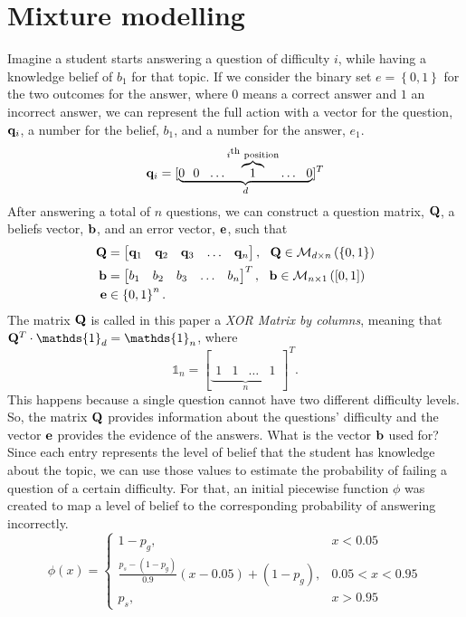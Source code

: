 \documentclass{article}
\newcommand{\0}{\mathbbold{0}}
\newcommand{\1}{\mathds{1}}
\begin{document}
\section{Mixture modelling}
Imagine a student starts answering a question of difficulty $i$, while having a knowledge belief of $b_1$ for that topic.
If we consider the binary set $e = \left\{0,1\right\}$ for the two outcomes for the answer, where $0$ means a correct answer and $1$ an incorrect answer,
we can represent the full action with a vector for the question, ${\bf q}_i$, a number for the belief, $b_1$, and a number for the answer, $e_1$.
\[ {\bf q}_i = [\underbrace{0 ~~ 0 ~~ \hdots \overbrace{1}^{i\textsuperscript{th}\text{ position}} \hdots ~~ 0}_d]^T \]
After answering a total of $n$ questions, we can construct a question matrix, ${\bf Q}$, a beliefs vector, ${\bf b}$, and an error vector, ${\bf e}$, such that
\begin{align*}
    {\bf Q} &= \begin{bmatrix}
        {\bf q}_1 & {\bf q}_2 & {\bf q}_3 & \hdots & {\bf q}_n
    \end{bmatrix}, ~~ {\bf Q} \in \mathcal{M}_{d\times n}\left(\left\{0,1\right\}\right) \\
    {\bf b} &= \begin{bmatrix}
        b_1 & b_2 & b_3 & \hdots & b_n
    \end{bmatrix}^T, ~~ {\bf b} \in \mathcal{M}_{n\times 1}\left([0,1]\right) \\
    {\bf e} &\in \left\{0,1\right\}^n.
\end{align*}
The matrix ${\bf Q}$ is called in this paper a \textsl{XOR Matrix by columns}, meaning that ${\bf Q}^T \cdot \1_d = \1_n$, where
$$ \1_n = [\underbrace{\begin{matrix}
        1 & 1 & \hdots & 1
    \end{matrix}}_n]^T. $$
This happens because a single question cannot have two different difficulty levels.
So, the matrix ${\bf Q}$ provides information about the questions' difficulty and the vector ${\bf e}$ provides the evidence of the answers.
What is the vector ${\bf b}$ used for? Since each entry represents the level of belief that the student has knowledge about the topic,
we can use those values to estimate the probability of failing a question of a certain difficulty.
For that, an initial piecewise function $\phi$ was created to map a level of belief to the corresponding probability of answering incorrectly.
$$ \phi(x) = \begin{cases*}
    1 - p_g, & x < 0.05 \\
    \frac{p_s - (1 - p_g)}{0.9}(x - 0.05) + (1 - p_g), & 0.05 < x < 0.95 \\
    p_s, & x > 0.95 
\end{cases*} $$
\end{document}
